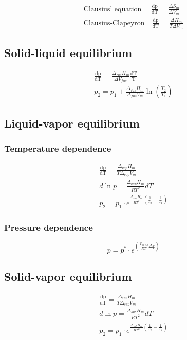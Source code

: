 \documentclass[a4paper]{report}
\begin{document}
\begin{multicols}{2}
    \begin{gather*}
        \text{Clausius' equation } \quad \frac{\mathrm{dp}}{\mathrm{dT}} = \frac{\Delta S_{m}}{\Delta V_{m}}\\
      \text{Clausius-Clapeyron} \quad \frac{\mathrm{dp}}{\mathrm{dT}} = \frac{\Delta H_{m}}{T \Delta V_{m}}
    \end{gather*}
    \subsection{Solid-liquid equilibrium}
    \begin{gather*}
      \frac{\mathrm{dp}}{\mathrm{dT}} = \frac{\Delta_{fus}  H_{m} }{\Delta V_{fus} } \frac{\mathrm{dT}}{\mathrm{T}} \\
      p_2 = p_1 + \frac{\Delta_{fus}  H_{m} }{\Delta_{fus}  V_{m}  } \ln \left( \frac{T_2}{T_1} \right) 
    \end{gather*}
    \subsection{Liquid-vapor equilibrium}
    \subsubsection{Temperature dependence}
    \begin{gather*}
      \frac{\mathrm{dp}}{\mathrm{dT}} = \frac{\Delta _{vap}H_{m}  }{T\Delta_{vap} V_{m} }\\
      d\ln p = \frac{\Delta_{vap}H_{m}  }{RT^{2} }dT\\
      p_{2} = p_1 \cdot e^{\frac{\Delta _{vap}H_{m}  }{RT^{2} } \left( \frac{1}{T_2}-\frac{1}{T_1}\right)}
    \end{gather*}
    \subsubsection{Pressure dependence}
    \[
      p = p^{*} \cdot e^{\left( \frac{V_{m,liq} }{RT}\Delta p\right) } 
    \] 
    \subsection{Solid-vapor equilibrium}
    \begin{gather*}
   \frac{\mathrm{dp}}{\mathrm{dT}} =  \frac{\Delta _{sub}H_{m}}{T\Delta_{sub}  V_{m} }   \\
      d\ln p = \frac{\Delta_{sub}H_{m}  }{RT^{2} }dT\\
      p_{2} = p_1 \cdot e^{\frac{\Delta _{sub}H_{m}  }{RT^{2} } \left( \frac{1}{T_2}-\frac{1}{T_1}\right)}
    \end{gather*}
  

    

        
  \end{multicols}
\end{document}

